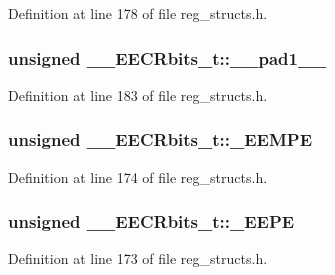 Definition at line 178 of file reg\+\_\+structs.\+h.

\hypertarget{union_____e_e_c_rbits__t_ae3e3c7136f72334202a33a7d1fcfd109}{
\subsubsection[{\+\_\+\+\_\+pad1\+\_\+\+\_\+}]{\setlength{\rightskip}{0pt plus 5cm}unsigned \+\_\+\+\_\+\+E\+E\+C\+Rbits\+\_\+t\+::\+\_\+\+\_\+pad1\+\_\+\+\_\+}}\label{union_____e_e_c_rbits__t_ae3e3c7136f72334202a33a7d1fcfd109}


Definition at line 183 of file reg\+\_\+structs.\+h.

\hypertarget{union_____e_e_c_rbits__t_a01f4d1528e11166bf0f4f603211e69ae}{
\subsubsection[{\+\_\+\+E\+E\+M\+P\+E}]{\setlength{\rightskip}{0pt plus 5cm}unsigned \+\_\+\+\_\+\+E\+E\+C\+Rbits\+\_\+t\+::\+\_\+\+E\+E\+M\+P\+E}}\label{union_____e_e_c_rbits__t_a01f4d1528e11166bf0f4f603211e69ae}


Definition at line 174 of file reg\+\_\+structs.\+h.

\hypertarget{union_____e_e_c_rbits__t_a3e9439f92f80a14f82bf3bef53f4526d}{
\subsubsection[{\+\_\+\+E\+E\+P\+E}]{\setlength{\rightskip}{0pt plus 5cm}unsigned \+\_\+\+\_\+\+E\+E\+C\+Rbits\+\_\+t\+::\+\_\+\+E\+E\+P\+E}}\label{union_____e_e_c_rbits__t_a3e9439f92f80a14f82bf3bef53f4526d}


Definition at line 173 of file reg\+\_\+structs.\+h.

